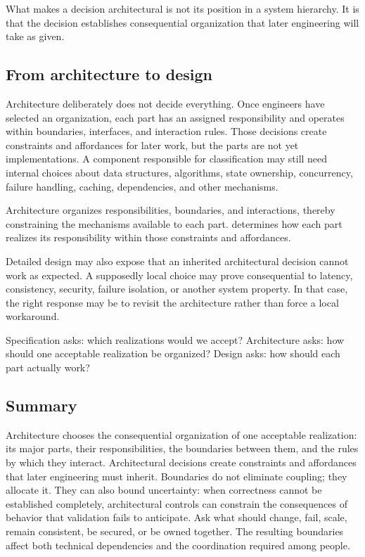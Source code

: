 What makes a decision architectural is not its position in a system hierarchy. It is that the
decision establishes consequential organization that later engineering will take as given.

\subsection{From architecture to design}\label{sec-to-design}

Architecture deliberately does not decide everything. Once engineers have selected an
organization, each part has an assigned responsibility and operates within boundaries, interfaces,
and interaction rules. Those decisions create constraints and affordances for later work, but the
parts are not yet implementations. A component responsible for classification may still need
internal choices about data structures, algorithms, state ownership,
concurrency, failure handling, caching, dependencies, and other mechanisms.

Architecture organizes responsibilities, boundaries, and interactions, thereby constraining the mechanisms available to each part.
\citet{ch-design} determines how each part realizes its responsibility within those constraints and affordances.

Detailed design may also expose that an inherited architectural decision cannot work as expected. A supposedly local
choice may prove consequential to latency, consistency, security, failure isolation, or another
system property. In that case, the right response may be to revisit the architecture rather than
force a local workaround.

Specification asks: which realizations would we accept? Architecture asks: how should one
acceptable realization be organized? Design asks: how should each part actually work?

\subsection{Summary}\label{summary}

Architecture chooses the consequential organization of one acceptable realization: its major
parts, their responsibilities, the boundaries between them, and the rules by which they interact.
Architectural decisions create constraints and affordances that later engineering must inherit.
Boundaries do not eliminate coupling; they allocate it. They can also bound uncertainty: when
correctness cannot be established completely, architectural controls can constrain the consequences
of behavior that validation fails to anticipate. Ask what should change, fail, scale, remain
consistent, be secured, or be owned together. The resulting boundaries affect both technical
dependencies and the coordination required among people.

